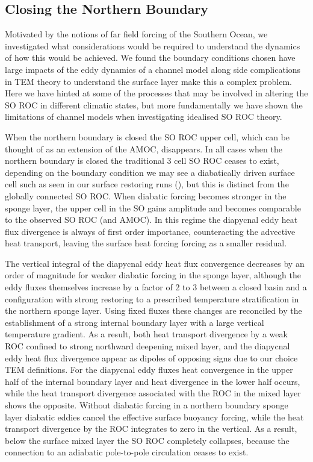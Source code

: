\label{chap:6}

\subsection{Closing the Northern Boundary}

Motivated by the notions of far field forcing of the Southern Ocean, we investigated what considerations would be required to understand the dynamics of how this would be achieved. We found the boundary conditions chosen have large impacts of the eddy dynamics of a channel model along side complications in TEM theory to understand the surface layer make this a complex problem. Here we have hinted at some of the processes that may be involved in altering the SO ROC in different climatic states, but more fundamentally we have shown the limitations of channel models when investigating idealised SO ROC theory.

When the northern boundary is closed the SO ROC upper cell, which can be thought of as an extension of the AMOC, disappears. In all cases when the northern boundary is closed the traditional 3 cell SO ROC ceases to exist, depending on the boundary condition we may see a diabatically driven surface cell such as seen in our surface restoring runs (), but this is distinct from the globally connected SO ROC. When diabatic forcing becomes stronger in the sponge layer, the upper cell in the SO gains amplitude and becomes comparable to the observed SO ROC (and AMOC). In this regime the diapycnal eddy heat flux divergence is always of first order importance, counteracting the advective heat transport, leaving the surface heat forcing forcing as a smaller residual. 

The vertical integral of the diapycnal eddy heat flux convergence decreases by an order of magnitude for weaker diabatic forcing in the sponge layer, although the eddy fluxes themselves increase by a factor of 2 to 3 between a closed basin and a configuration with strong restoring to a prescribed temperature stratification in the northern sponge layer. Using fixed fluxes these changes are reconciled by the establishment of a strong internal boundary layer with a large vertical temperature gradient. 
As a result, both heat transport divergence by a weak ROC confined to strong northward deepening mixed layer, and the diapycnal eddy heat flux divergence appear as dipoles of opposing signs due to our choice TEM definitions. For the diapycnal eddy fluxes heat convergence in the upper half of the internal boundary layer and heat divergence in the lower half occurs, while the heat transport divergence associated with the ROC in the mixed layer shows the opposite.
Without diabatic forcing in a northern boundary sponge layer diabatic eddies cancel the effective surface buoyancy forcing, while the heat transport divergence by the ROC integrates to zero in the vertical. As a result, below the surface mixed layer the SO ROC completely collapses, because  the connection to an adiabatic pole-to-pole circulation ceases to exist. 

